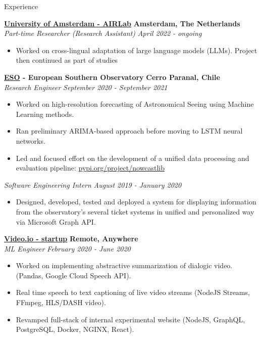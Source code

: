 \documentclass{resume} %
\begin{document}
\begin{rSection}{Experience}

	{\bf \href{https://icai.ai/airlab/}{University of Amsterdam - AIRLab}} \hfill \textbf{Amsterdam,
		The Netherlands}
	\\ \textit{Part-time Researcher (Research Assistant)} \hfill {\em April 2022 - ongoing}
	\begin{itemize}\vspace{-0.5em}
		\item Worked on cross-lingual adaptation of large language models (LLMs).
		      Project then continued as part of studies
	\end{itemize}

	{\bf \href{https://www.eso.org}{ESO} - European Southern Observatory} \hfill \textbf{Cerro Paranal, Chile}
	\\ \textit{Research Engineer} \hfill {\em September 2020 - September 2021}
	\begin{itemize}\vspace{-0.5em}
		\item Worked on high-resolution forecasting of Astronomical Seeing using Machine Learning
		      methods.
		\item Ran preliminary ARIMA-based approach before moving to LSTM neural networks.
		\item Led and focused effort on the development of a unified data processing and evaluation
		      pipeline: \href{https://pypi.org/project/nowcastlib/}{pypi.org/project/nowcastlib}
	\end{itemize}
	\textit{Software Engineering Intern} \hfill {\em August 2019 - January 2020}
	\begin{itemize}\vspace{-0.5em}
		\item Designed, developed, tested and deployed a system for displaying information from the
		      observatory's several ticket systems in unified and personalized way via Microsoft Graph API.
	\end{itemize}

	{\bf \href{https://video.io/}{Video.io - startup}} \hfill \textbf{Remote, Anywhere}
	\\ \textit{ML Engineer} \hfill {\em February 2020 - June 2020}
	\begin{itemize}\vspace{-0.5em}
		\item Worked on implementing abstractive summarization of dialogic video. (Pandas, Google Cloud
		      Speech API).
		\item Real time speech to text captioning of live video streams (NodeJS Streams, FFmpeg,
		      HLS/DASH video).
		\item Revamped full-stack of internal experimental website (NodeJS, GraphQL, PostgreSQL, Docker,
		      NGINX, React).
	\end{itemize}


\end{rSection}
\end{document}
